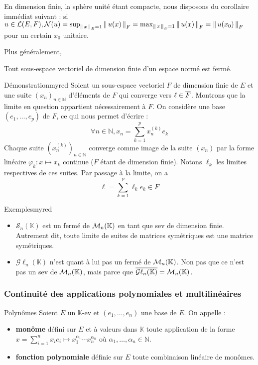     En dimension finie, la sphère unité étant compacte, nous disposons du corollaire immédiat suivant : si $u \in \mathcal{L}(E,F), \mathcal{N}(u) = \sup_{\left\lVert\,x\,\right\rVert_E = 1} \left\lVert\,u(x)\,\right\rVert_F = \max_{\left\lVert\,x\,\right\rVert_E = 1} \left\lVert\,u(x)\,\right\rVert_F = \left\lVert\,u(x_0)\,\right\rVert_F$ pour un certain $x_0$ unitaire.

    Plus généralement, 

    \begin{theo}{}{}
        Tout sous-espace vectoriel de dimension finie d’un espace normé est fermé.
    \end{theo}

    \begin{demo}{Démonstration}{myred}
        Soient un sous-espace vectoriel $F$ de dimension finie de $E$ et une suite $(x_n)_{n \in \mathbb{N}}$ d’éléments de $F$ qui converge vers $\ell \in \overline{F}$. Montrons que la limite en question appartient nécessairement à $F$. On considère une base $(e_1,\ldots,e_p)$ de $F$, ce qui nous permet d’écrire :
        \[ \forall n \in \mathbb{N}, x_n = \sum_{k=1}^p x_n^{(k)} e_k \] 
        Chaque suite $(x_n^{(k)})_{n \in \mathbb{N}}$ converge comme image de la suite $(x_n)$ par la forme linéaire $\varphi_k : x \mapsto x_k$ continue ($F$ étant de dimension finie). Notons $\ell_k$ les limites respectives de ces suites. Par passage à la limite, on a 
        \[ \ell = \sum_{k=1}^p \ell_k e_k \in F \] 
    \end{demo}

    \begin{omed}{Exemples}{myred}
        \begin{itemize}
            \item $\mathcal{S}_n(\mathbb{K})$ est un fermé de $\mathcal{M}_{n}(\mathbb{K})$ en tant que sev de dimension finie. Autrement dit, toute limite de suites de matrices symétriques est une matrice symétriques.
            \item $\mathcal{G}\ell_n(\mathbb{K})$ n’est quant à lui pas un fermé de $\mathcal{M}_{n}(\mathbb{K})$. Non pas que ce n’est pas un sev de $\mathcal{M}_{n}(\mathbb{K})$, mais parce que $\overline{\mathcal{G}\ell_n(\mathbb{K})} = \mathcal{M}_{n}(\mathbb{K})$.
        \end{itemize}
    \end{omed}

    \subsubsection{Continuité des applications polynomiales et multilinéaires}

    \begin{defi}{Polynômes}{}
        Soient $E$ un $\mathbb{K}$-ev et $(e_1,\ldots,e_n)$ une base de $E$. On appelle :
        \begin{itemize}
            \item \textbf{monôme} défini sur $E$ et à valeurs dans $\mathbb{K}$ toute application de la forme $x = \sum_{i=1}^n x_i e_i \longmapsto x_1^{\alpha_1} \cdots x_n^{\alpha_n}$ où $\alpha_1,\ldots,\alpha_n \in \mathbb{N}$.
            \item \textbf{fonction polynomiale} définie sur $E$ toute combinaison linéaire de monômes.
        \end{itemize}
    \end{defi}


